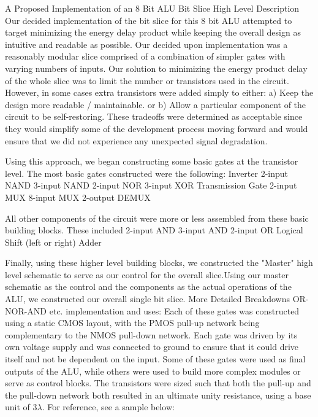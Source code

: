 \documentclass[12pt]{article}
\begin{document}
	A Proposed Implementation of an 8 Bit ALU Bit Slice
	\newline
	High Level Description
	\newline
	Our decided implementation of the bit slice for this 8 bit ALU attempted to target
	minimizing the energy delay product while keeping the overall design as intuitive and 
	readable as possible. Our decided upon implementation was a reasonably modular 
	slice comprised of a combination of simpler gates with varying numbers of inputs. Our
	solution to minimizing the energy product delay of the whole slice was to limit the number
	or transistors used in the circuit. However, in some cases extra transistors were added
	simply to either:
		a) Keep the design more readable / maintainable. 
		or
		b) Allow a particular component of the circuit to be self-restoring. 
	These tradeoffs were determined as acceptable since they would simplify some of the
	development process moving forward and would ensure that we did not experience any
	unexpected signal degradation. 
	
	Using this approach, we began constructing some basic gates at the transistor level. The most
	basic gates constructed were the following:
		Inverter
		2-input NAND
		3-input NAND
		2-input NOR
		3-input XOR
		Transmission Gate
		2-input MUX
		8-input MUX
		2-output DEMUX
	
	All other components of the circuit were more or less assembled from these basic building
	blocks. These included
		2-input AND
		3-input AND
		2-input OR
		Logical Shift (left or right)
		Adder
	
	Finally, using these higher level building blocks, we constructed the "Master" high level
	schematic to serve as our control for the overall slice.Using our master schematic as 
	the control and the components as the actual operations of the ALU, we constructed 
	our overall single bit slice. 
	\newline
	More Detailed Breakdowns
	\newline
	OR-NOR-AND etc. implementation and uses:
	Each of these gates was constructed using a static CMOS layout, with the PMOS pull-up 
	network being complementary to the NMOS pull-down network. Each gate was driven by
	its own voltage supply and was connected to ground to ensure that it could drive itself and
	not be dependent on the input. Some of these gates were used as final outputs of the ALU,
	while others were used to build more complex modules or serve as control blocks. The 
	transistors were sized such that both the pull-up and the pull-down network
	both resulted in an ultimate unity resistance, using a base unit of 3$\lambda$. 
	For reference, see a sample below:
	
\end{document}
